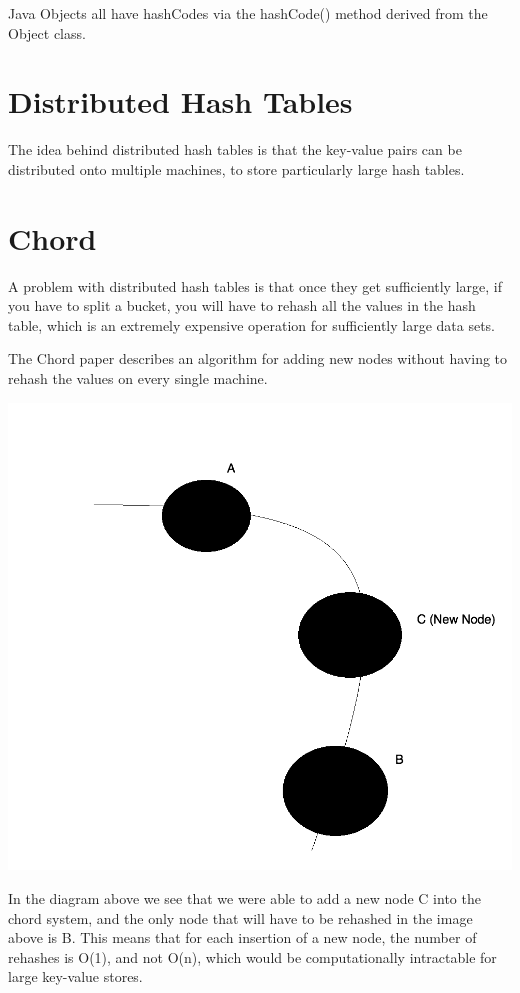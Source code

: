 \documentclass[twoside]{article}
\begin{document}
Java Objects all have hashCodes via the hashCode() method derived from the Object class.

\section{Distributed Hash Tables}

The idea behind distributed hash tables is that the key-value pairs can be distributed onto multiple machines, to store particularly large hash tables.

\section{Chord}

A problem with distributed hash tables is that once they get sufficiently large, if you have to split a bucket, you will have to rehash all the values in the hash table, which is an extremely expensive operation for sufficiently large data sets. 

The Chord paper describes an algorithm for adding new nodes without having to rehash the values on every single machine.

\begin{center}
\includegraphics{chord_new_node.png}
\end{center}

In the diagram above we see that we were able to add a new node C into the chord system, and the only node that will have to be rehashed in the image above is B. This means that for each insertion of a new node, the number of rehashes is O(1), and not O(n), which would be computationally intractable for large key-value stores.
\end{document}
